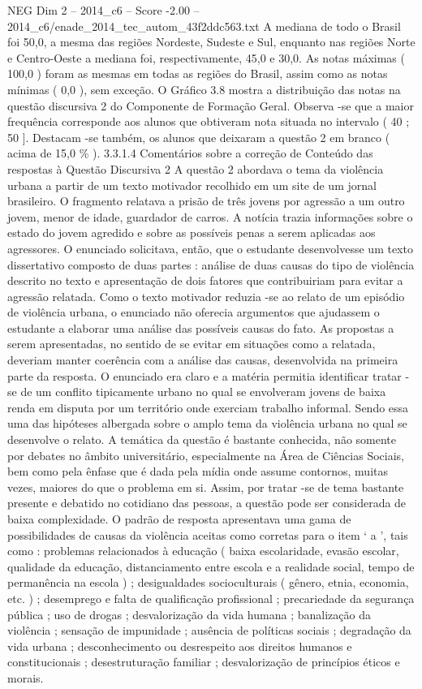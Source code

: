 \begin{textsample}{NEG Dim 2 – 2014\_c6 – Score -2.00 – 2014\_c6/enade\_2014\_tec\_autom\_43f2ddc563.txt}
A mediana de todo o Brasil foi 50,0, a mesma das regiões Nordeste, Sudeste e Sul, enquanto nas regiões Norte e Centro-Oeste a mediana foi, respectivamente, 45,0 e 30,0.
As notas máximas ( 100,0 ) foram as mesmas em todas as regiões do Brasil, assim como as notas mínimas ( 0,0 ), sem exceção.
O Gráfico 3.8 mostra a distribuição das notas na questão discursiva 2 do Componente de Formação Geral.
Observa -se que a maior frequência corresponde aos alunos que obtiveram nota situada no intervalo ( 40 ; 50 ].
Destacam -se também, os alunos que deixaram a questão 2 em branco ( acima de 15,0 \% ). 3.3.1.4 Comentários sobre a correção de Conteúdo das respostas à Questão Discursiva 2 A questão 2 abordava o tema da violência urbana a partir de um texto motivador recolhido em um site de um jornal brasileiro.
O fragmento relatava a prisão de três jovens por agressão a um outro jovem, menor de idade, guardador de carros.
A notícia trazia informações sobre o estado do jovem agredido e sobre as possíveis penas a serem aplicadas aos agressores.
O enunciado solicitava, então, que o estudante desenvolvesse um texto dissertativo composto de duas partes : análise de duas causas do tipo de violência descrito no texto e apresentação de dois fatores que contribuiriam para evitar a agressão relatada.
Como o texto motivador reduzia -se ao relato de um episódio de violência urbana, o enunciado não oferecia argumentos que ajudassem o estudante a elaborar uma análise das possíveis causas do fato.
As propostas a serem apresentadas, no sentido de se evitar em situações como a relatada, deveriam manter coerência com a análise das causas, desenvolvida na primeira parte da resposta.
O enunciado era claro e a matéria permitia identificar tratar -se de um conflito tipicamente urbano no qual se envolveram jovens de baixa renda em disputa por um território onde exerciam trabalho informal.
Sendo essa uma das hipóteses albergada sobre o amplo tema da violência urbana no qual se desenvolve o relato.
A temática da questão é bastante conhecida, não somente por debates no âmbito universitário, especialmente na Área de Ciências Sociais, bem como pela ênfase que é dada pela mídia onde assume contornos, muitas vezes, maiores do que o problema em si.
Assim, por tratar -se de tema bastante presente e debatido no cotidiano das pessoas, a questão pode ser considerada de baixa complexidade.
O padrão de resposta apresentava uma gama de possibilidades de causas da violência aceitas como corretas para o item ‘ a ’, tais como : problemas relacionados à educação ( baixa escolaridade, evasão escolar, qualidade da educação, distanciamento entre escola e a realidade social, tempo de permanência na escola ) ; desigualdades socioculturais ( gênero, etnia, economia, etc. ) ; desemprego e falta de qualificação profissional ; precariedade da segurança pública ; uso de drogas ; desvalorização da vida humana ; banalização da violência ; sensação de impunidade ; ausência de políticas sociais ; degradação da vida urbana ; desconhecimento ou desrespeito aos direitos humanos e constitucionais ; desestruturação familiar ; desvalorização de princípios éticos e morais.

\end{textsample}
